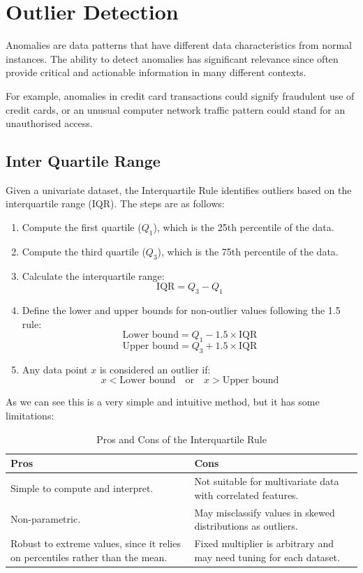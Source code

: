 \documentclass[11pt,english,a4paper,hidelinks]{book}
\begin{document}
\section{Outlier Detection}

Anomalies are data patterns that have different data characteristics from normal
instances. The ability to detect anomalies has significant relevance since often provide critical and actionable information in many different contexts.

\vspace{0.5cm}
\noindent For example, anomalies in credit card transactions could signify fraudulent use of
credit cards, or an unusual computer network traffic pattern could stand for an
unauthorised access.


\subsection{Inter Quartile Range}

Given a univariate dataset, the Interquartile Rule identifies outliers based on the interquartile range (IQR). The steps are as follows:

\begin{enumerate}
    \item Compute the first quartile ($Q_1$), which is the 25th percentile of the data.
    \item Compute the third quartile ($Q_3$), which is the 75th percentile of the data.
    \item Calculate the interquartile range:
    \[
        \text{IQR} = Q_3 - Q_1
    \]
    \item Define the lower and upper bounds for non-outlier values following the 1.5 rule:
    \[
        \text{Lower bound} = Q_1 - 1.5 \times \text{IQR}
    \]
    \[
        \text{Upper bound} = Q_3 + 1.5 \times \text{IQR}
    \]
    \item Any data point $x$ is considered an outlier if:
    \[
        x < \text{Lower bound} \quad \text{or} \quad x > \text{Upper bound}
    \]
\end{enumerate}

\noindent As we can see this is a very simple and intuitive method, but it has some limitations:

\begin{table}[H]
    \centering
    \begin{tabular}{|p{7cm}|p{7cm}|}
    \hline
    \textbf{Pros} & \textbf{Cons} \\
    \hline
    Simple to compute and interpret. & Not suitable for multivariate data with correlated features. \\
    \hline
    Non-parametric. & May misclassify values in skewed distributions as outliers. \\
    \hline
    Robust to extreme values, since it relies on percentiles rather than the mean. & Fixed multiplier is arbitrary and may need tuning for each dataset. \\
    \hline
    \end{tabular}
    \caption{Pros and Cons of the Interquartile Rule}
\end{table}
\end{document}
